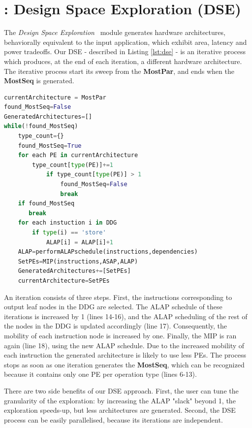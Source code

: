 \section{\frameworkname: Design Space Exploration (DSE)}
\label{ssec:dse}
The \textit{Design Space Exploration} \frameworkname~module generates hardware architectures, behaviorally equivalent to the input application, which exhibit area, latency and power tradeoffs.
Our DSE - described in Listing \ref{lst:dse} - is an iterative process which produces, at the end of each iteration, a different hardware architecture.
The iterative process start its sweep from the \textbf{MostPar}, and ends when the \textbf{MostSeq} is generated.
\begin{lstlisting}[language=Python, caption={\small Design Space Exploration},label={lst:dse},basicstyle=\tiny]
currentArchitecture = MostPar
found_MostSeq=False
GeneratedArchitectures=[]
while(!found_MostSeq)
    type_count={}
    found_MostSeq=True
    for each PE in currentArchitecture
        type_count[type(PE)]+=1
            if type_count[type(PE)] > 1
                found_MostSeq=False
                break
    if found_MostSeq
       break
    for each instuction i in DDG
        if type(i) == 'store'
            ALAP[i] = ALAP[i]+1
    ALAP=performALAPschedule(instructions,dependencies)
    SetPEs=MIP(instructions,ASAP,ALAP)
    GeneratedArchitectures+=[SetPEs]
    currentArchitecture=SetPEs
\end{lstlisting}
An iteration consists of three steps. First, the instructions corresponding to output leaf nodes in the DDG are selected. The ALAP schedule of these iterations is increased by 1 (lines 14-16), and the ALAP scheduling of the rest of the nodes in the DDG is updated accordingly (line 17). Consequently, the mobility of each instruction node is increased by one. Finally, the MIP is ran again (line 18), using the new ALAP schedule. Due to the increased mobility of each instruction the generated architecture is likely to use less PEs.
The process stops as soon as one iteration generates the \textbf{MostSeq}, which can be recognized because it contains only one PE per operation type (lines 6-13).

There are two side benefits of our DSE approach. First, the user can tune the granularity of the exploration: by increasing the ALAP "slack" beyond 1, the exploration speeds-up, but less architectures are generated. Second, the DSE process can be easily parallelised, because its iterations are independent.

